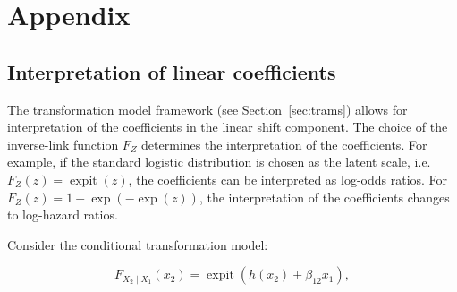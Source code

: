 



\chapter{Appendix}



% 






\section{Interpretation of linear coefficients} \label{sec:interpretation_linear_coefficients}

The transformation model framework (see Section~\ref{sec:trams}) allows for interpretation of the coefficients in the linear shift component. The choice of the inverse-link function $F_Z$ determines the interpretation of the coefficients. For example, if the standard logistic distribution is chosen as the latent scale, i.e. $F_Z(z) = \operatorname{expit}(z)$, the coefficients can be interpreted as log-odds ratios. For $F_Z(z) = 1-\exp(-\exp(z))$, the interpretation of the coefficients changes to log-hazard ratios.

Consider the conditional transformation model:

\begin{equation*}
F_{X_2 \mid X_1}(x_2) = \operatorname{expit}( h(x_2) + \beta_{12} x_1 ),
\end{equation*}


